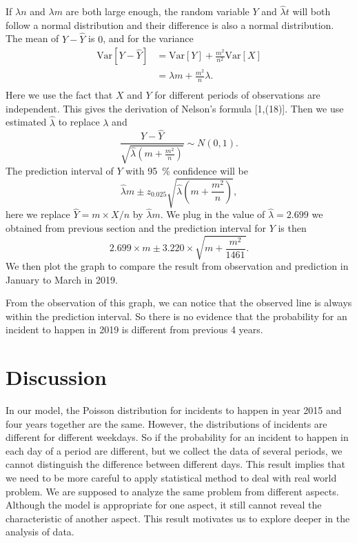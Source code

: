 \documentclass[11pt,a4paper,english]{article}
\begin{document}
If $\lambda n$ and $\lambda m$ are both large enough, the random variable $Y$ and $\hat{\lambda}t$ will both follow a normal distribution and their difference is also a normal distribution.
The mean of $Y-\hat{Y}$ is $0$, and for the variance
\begin{align*}
	\text{Var}[Y-\hat{Y}] &= \text{Var}[Y]+\frac{m^{2}}{n^{2}}\text{Var}[X]\\
	&= \lambda m+\frac{m^{2}}{n}\lambda.\\
\end{align*}
Here we use the fact that $X$ and $Y$ for different periods of observations are independent.
This gives the derivation of Nelson's formula [1,(18)].
Then we use estimated $\hat{\lambda}$ to replace $\lambda$ and 
\begin{equation*}
	\frac{Y-\hat{Y}}{\sqrt{\hat{\lambda}\left(m+\frac{m^{2}}{n}\right)}} \sim N(0,1).
\end{equation*}
The prediction interval of $Y$ with \SI{95}{\percent} confidence will be 
\begin{equation*}
	\hat{\lambda}m \pm z_{0.025}\sqrt{\hat{\lambda}\left(m+\frac{m^{2}}{n}\right)},
\end{equation*}
here we replace $\hat{Y} = m \times X/n$ by $\hat{\lambda}m$. We plug in the value of $\hat{\lambda} = 2.699$ we obtained from previous section and the prediction interval for $Y$ is then 
\begin{equation*}
	2.699 \times m \pm 3.220 \times \sqrt{m+\frac{m^{2}}{1461}}.
\end{equation*} 
We then plot the graph to compare the result from observation and prediction in January to March in 2019. 


From the observation of this graph, we can notice that the observed line is always within the prediction interval. So there is no evidence that the probability for an incident to happen in 2019 is different from previous 4 years.
\section{Discussion}
In our model, the Poisson distribution for incidents to happen in year 2015 and four years together are the same. However, the distributions of incidents are different for different weekdays. So if the probability for an incident to happen in each day of a period are different, but we collect the data of several periods, we cannot distinguish the difference between different days. This result implies that we need to be more careful to apply statistical method to deal with real world problem. We are supposed to analyze the same problem from different aspects. Although the model is appropriate for one aspect, it still cannot reveal the characteristic of another aspect. This result motivates us to explore deeper in the analysis of data. 
\end{document}
